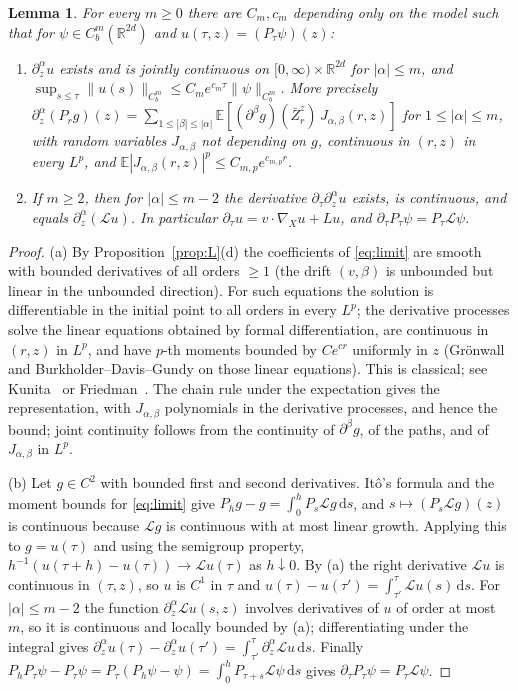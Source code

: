 \documentclass[11pt]{article}
\newcommand{\dd}{\mathrm{d}}
\newcommand{\E}{\mathbb{E}}
\newcommand{\cL}{\mathcal{L}}
\newcommand{\R}{\mathbb{R}}
\newcommand{\nrm}[2]{\|#1\|_{#2}}
\newtheorem{lemma}[theorem]{Lemma}
\theoremstyle{remark}
\begin{document}
\begin{lemma}\label{lem:semigroup}
For every $m\ge0$ there are $C_m,c_m$ depending only on the model such that
for $\psi\in C_b^m(\R^{2d})$ and $u(\tau,z)=(P_\tau\psi)(z)$:
\begin{enumerate}
  \item[(a)] $\partial_z^\alpha u$ exists and is jointly continuous on
    $[0,\infty)\times\R^{2d}$ for $|\alpha|\le m$, and
    $\sup_{s\le\tau}\nrm{u(s)}{C_b^m}\le C_me^{c_m\tau}\nrm{\psi}{C_b^m}$.
    More precisely $\partial_z^\alpha(P_rg)(z)=\sum_{1\le|\beta|\le|\alpha|}
    \E[(\partial^\beta g)(\bar Z^z_r)\,J_{\alpha,\beta}(r,z)]$ for
    $1\le|\alpha|\le m$, with random variables $J_{\alpha,\beta}$ not
    depending on $g$, continuous in $(r,z)$ in every $L^p$, and
    $\E|J_{\alpha,\beta}(r,z)|^p\le C_{m,p}e^{c_{m,p}r}$.
  \item[(b)] If $m\ge2$, then for $|\alpha|\le m-2$ the derivative
    $\partial_\tau\partial_z^\alpha u$ exists, is continuous, and equals
    $\partial_z^\alpha(\cL u)$. In particular $\partial_\tau u=v\cdot\nabla_X
    u+Lu$, and $\partial_\tau P_\tau\psi=P_\tau\cL\psi$.
\end{enumerate}
\end{lemma}

\begin{proof}
(a) By Proposition~\ref{prop:L}(d) the coefficients of \eqref{eq:limit} are
smooth with bounded derivatives of all orders $\ge1$ (the drift $(v,\beta)$
is unbounded but linear in the unbounded direction). For such equations the
solution is differentiable in the initial point to all orders in every
$L^p$; the derivative processes solve the linear equations obtained by
formal differentiation, are continuous in $(r,z)$ in $L^p$, and have
$p$-th moments bounded by $C e^{cr}$ uniformly in $z$ (Gr\"onwall and
Burkholder--Davis--Gundy on those linear equations). This is classical;
see Kunita~\cite{Kunita} or Friedman~\cite{Friedman}. The chain rule under
the expectation gives the representation, with $J_{\alpha,\beta}$
polynomials in the derivative processes, and hence the bound; joint
continuity follows from the continuity of $\partial^\beta g$, of the paths,
and of $J_{\alpha,\beta}$ in $L^p$.

(b) Let $g\in C^2$ with bounded first and second derivatives. It\^o's
formula and the moment bounds for \eqref{eq:limit} give
$P_hg-g=\int_0^hP_s\cL g\,\dd s$, and $s\mapsto(P_s\cL g)(z)$ is continuous
because $\cL g$ is continuous with at most linear growth. Applying this to
$g=u(\tau)$ and using the semigroup property,
$h^{-1}(u(\tau+h)-u(\tau))\to\cL u(\tau)$ as $h\downarrow0$. By (a) the
right derivative $\cL u$ is continuous in $(\tau,z)$, so $u$ is $C^1$ in
$\tau$ and $u(\tau)-u(\tau')=\int_{\tau'}^\tau\cL u(s)\,\dd s$. For
$|\alpha|\le m-2$ the function $\partial_z^\alpha\cL u(s,z)$ involves
derivatives of $u$ of order at most $m$, so it is continuous and locally
bounded by (a); differentiating under the integral gives
$\partial_z^\alpha u(\tau)-\partial_z^\alpha u(\tau')=\int_{\tau'}^\tau
\partial_z^\alpha\cL u\,\dd s$. Finally
$P_h P_\tau\psi-P_\tau\psi=P_\tau(P_h\psi-\psi)=\int_0^hP_{\tau+s}\cL\psi\,\dd
s$ gives $\partial_\tau P_\tau\psi=P_\tau\cL\psi$.
\end{proof}
\end{document}
